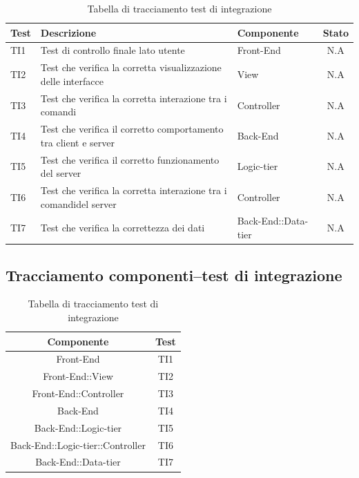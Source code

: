 \begin{center}
	\begin{table}[h]
		\begin{tabular}{|l|p{}|l|c|}
		\toprule
			\textbf{Test} & \textbf{Descrizione} & \textbf{Componente} & \textbf{Stato} \\
			\midrule
			TI1 & Test di controllo finale lato utente & Front-End & N.A\\
			\midrule
			TI2 & Test che verifica la corretta visualizzazione delle interfacce & View & N.A\\
			\midrule
			TI3 & Test che verifica la corretta interazione tra i comandi & Controller & N.A\\
			\midrule
			TI4 & Test che verifica il corretto comportamento tra client e server & Back-End & N.A\\
			\midrule
			TI5 & Test che verifica il corretto funzionamento del server & Logic-tier & N.A\\
			\midrule
			TI6 & Test che verifica la corretta interazione tra i comandidel server & Controller & N.A\\
			\midrule
			TI7 & Test che verifica la correttezza dei dati & Back-End::Data-tier & N.A\\
		\bottomrule
		\end{tabular}
		\caption{Tabella di tracciamento test di integrazione}
	\end{table}
\end{center}

\subsection{Tracciamento componenti–test di integrazione}

\begin{center}
	\begin{table}[h]
		\begin{tabular}{|c|c|}
		\toprule
			\textbf{Componente} & \textbf{Test}\\
			\midrule
			Front-End & TI1\\
			\midrule
			Front-End::View & TI2\\
			\midrule
			Front-End::Controller & TI3\\
			\midrule
			Back-End & TI4\\
			\midrule
			Back-End::Logic-tier & TI5\\
			\midrule
			Back-End::Logic-tier::Controller & TI6\\
			\midrule
			Back-End::Data-tier & TI7\\
		\bottomrule
		\end{tabular}
		\caption{Tabella di tracciamento test di integrazione}
	\end{table}
\end{center}

